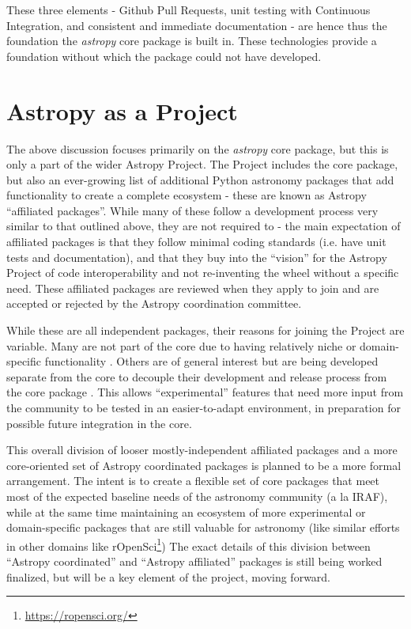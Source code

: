 \documentclass[11pt,twoside]{article}
\newcommand{\astropypkg}{\textit{astropy}}
\begin{document}
These three elements - Github Pull Requests, unit testing with Continuous Integration, and consistent and immediate documentation - are hence thus the foundation the \astropypkg{} core package is built in.
These technologies provide a foundation without which the package could not have developed.


\section{Astropy as a Project}

The above discussion focuses primarily on the \astropypkg{} core package, but this is only a part of the wider Astropy Project.
The Project includes the core package, but also an ever-growing list of additional Python astronomy packages that add functionality to create a complete ecosystem - these are known as Astropy ``affiliated packages''.
While many of these follow a development process very similar to that outlined above, they are not required to - the main expectation of affiliated packages is that they follow minimal coding standards (i.e. have unit tests and documentation), and that they buy into the ``vision'' for the Astropy Project of code interoperability and not re-inventing the wheel without a specific need.
These affiliated packages are reviewed when they apply to join and are accepted or rejected by the Astropy coordination committee.

While these are all independent packages, their reasons for joining the Project are variable.
Many are not part of the core due to having relatively niche or domain-specific functionality \citep[e.g.][]{halotools}.
Others are of general interest but are being developed separate from the core to decouple their development and release process from the core package \citep[e.g.][]{photutils}.
This allows ``experimental'' features that need more input from the community to be tested in an easier-to-adapt environment, in preparation for possible future integration in the core.

This overall division of looser mostly-independent affiliated packages and a more core-oriented set of Astropy coordinated packages is planned to be a more formal arrangement.
The intent is to create a flexible set of core packages that meet most of the expected baseline needs of the astronomy community (a la IRAF), while at the same time maintaining an ecosystem of more experimental or domain-specific packages that are still valuable for astronomy (like similar efforts in other domains like  rOpenSci\footnote{\url{https://ropensci.org/}})
The exact details of this division between ``Astropy coordinated'' and ``Astropy affiliated'' packages is still being worked finalized, but will be a key element of the project, moving forward.
\end{document}
